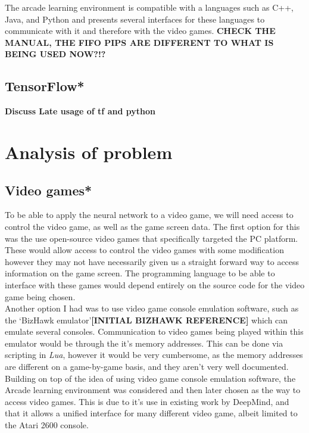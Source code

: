 \documentclass[10pt]{article}
\begin{document}
		The arcade learning environment is compatible with a languages such as C++, Java, and Python and presents several interfaces for these languages to communicate with it and therefore with the video games. \textbf{CHECK THE MANUAL, THE FIFO PIPS ARE DIFFERENT TO WHAT IS BEING USED NOW?!?}
	\bigskip
	
	\subsection{TensorFlow*}
	\textbf{Discuss Late usage of tf and python}
	
	\bigskip

\section{Analysis of problem}
	
	\subsection{Video games*}
		To be able to apply the neural network to a video game, we will need access to control the video game, as well as the game screen data. The first option for this was the use open-source video games that specifically targeted the PC platform. These would allow access to control the video games with some modification however they may not have necessarily given us a straight forward way to access information on the game screen. The programming language to be able to interface with these games would depend entirely on the source code for the video game being chosen.\\
		
		Another option I had was to use video game console emulation software, such as the `BizHawk emulator'\textbf{[INITIAL BIZHAWK REFERENCE]} which can emulate several consoles. Communication to video games being played within this emulator would be through the it's memory addresses. This can be done via scripting in \textit{Lua}, however it would be very cumbersome, as the memory addresses are different on a game-by-game basis, and they aren't very well documented.\\
		
		Building on top of the idea of using video game console emulation software, the Arcade learning environment was considered and then later chosen as the way to access video games. This is due to it's use in existing work by DeepMind, and that it allows a unified interface for many different video game, albeit limited to the Atari 2600 console.\\	
	
\end{document}
